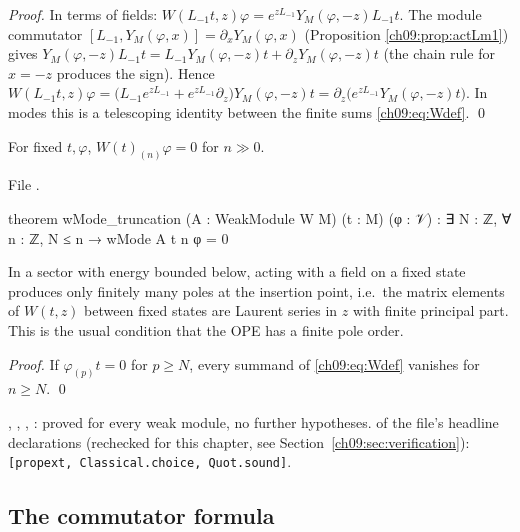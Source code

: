 \noindent\emph{Proof.} In terms of fields: $W(L_{-1}t,z)\varphi=e^{zL_{-1}}Y_M(\varphi,-z)L_{-1}t$.
The module commutator $[L_{-1},Y_M(\varphi,x)]=\partial_xY_M(\varphi,x)$ (Proposition
\ref{ch09:prop:actLm1}) gives $Y_M(\varphi,-z)L_{-1}t=L_{-1}Y_M(\varphi,-z)t+\partial_zY_M(\varphi,-z)t$
(the chain rule for $x=-z$ produces the sign). Hence
$W(L_{-1}t,z)\varphi=\big(L_{-1}e^{zL_{-1}}+e^{zL_{-1}}\partial_z\big)Y_M(\varphi,-z)t=\partial_z\big(e^{zL_{-1}}Y_M(\varphi,-z)t\big)$.
In modes this is a telescoping identity between the finite sums \eqref{ch09:eq:Wdef}. \qed

\begin{proposition}[Truncation]\label{ch09:prop:Wtrunc}
For fixed $t,\varphi$, $W(t)_{(n)}\varphi=0$ for $n\gg0$.
\end{proposition}
\noindent File .
\begin{leancode}
theorem wMode_truncation (A : WeakModule W M) (t : M) (φ : 𝒱) :
    ∃ N : ℤ, ∀ n : ℤ, N ≤ n → wMode A t n φ = 0
\end{leancode}
\begin{physics}
In a sector with energy bounded below, acting with a field on a fixed state produces only finitely many poles at the insertion point, i.e.\ the matrix elements of $W(t,z)$ between fixed states are Laurent series in $z$ with finite principal part. This is the usual condition that the OPE has a finite pole order.
\end{physics}

\noindent\emph{Proof.} If $\varphi_{(p)}t=0$ for $p\ge N$, every summand of \eqref{ch09:eq:Wdef}
vanishes for $n\ge N$. \qed

\begin{status}
, , , : proved for every
weak module, no further hypotheses.  of the file's headline declarations
(rechecked for this chapter, see Section~\ref{ch09:sec:verification}):
\texttt{[propext, Classical.choice, Quot.sound]}.
\end{status}

\subsection{The commutator formula}

